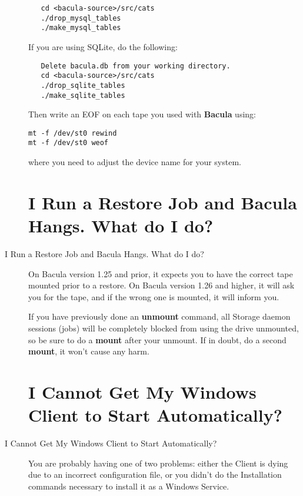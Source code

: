 \begin{description}
\footnotesize
\begin{verbatim}
   cd <bacula-source>/src/cats
   ./drop_mysql_tables
   ./make_mysql_tables

\end{verbatim}
\normalsize

If you are using SQLite, do the following:

\footnotesize
\begin{verbatim}
   Delete bacula.db from your working directory.
   cd <bacula-source>/src/cats
   ./drop_sqlite_tables
   ./make_sqlite_tables

\end{verbatim}
\normalsize

Then write an EOF on each tape you used with {\bf Bacula} using:

\footnotesize
\begin{verbatim}
mt -f /dev/st0 rewind
mt -f /dev/st0 weof
\end{verbatim}
\normalsize

where you need to adjust the device name for your system.

\label{restorehang}
\section{I Run a Restore Job and Bacula Hangs. What do I do?}
\item [I Run a Restore Job and Bacula Hangs. What do I do?]
   On Bacula version 1.25 and prior, it expects you to have the correct
   tape mounted prior to a restore.  On Bacula version 1.26 and higher, it
   will ask you for the tape, and if the wrong one is mounted, it will
   inform you.

   If you have previously done an {\bf unmount} command, all Storage daemon
   sessions (jobs) will be completely blocked from using the drive
   unmounted, so be sure to do a {\bf mount} after your unmount.  If in
   doubt, do a second {\bf mount}, it won't cause any harm.

\label{windowstart}
\section{I Cannot Get My Windows Client to Start Automatically? }
\item [I Cannot Get My Windows Client to Start Automatically? ]
   You are probably having one of two problems: either the Client is dying
   due to an incorrect configuration file, or you didn't do the
   Installation commands necessary to install it as a Windows Service.


\end{description}

